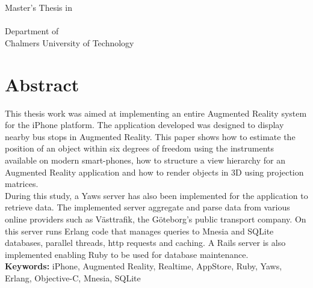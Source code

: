 \noindent
\thesistitle\\
\thesissubtitle\\
Master's Thesis in \textsf{\thesisprogram}\\
\thesisauthor\\
Department of \thesisdepartment\\
Chalmers University of Technology\\

\vspace{1.5cm}
\section*{Abstract}

This thesis work was aimed at implementing an entire Augmented Reality system for the iPhone platform. The application developed was designed to display nearby bus stops in Augmented Reality. This paper shows how to estimate the position of an object within six degrees of freedom using the instruments available on modern smart-phones, how to structure a view hierarchy for an Augmented Reality application and how to render objects in 3D using projection matrices.\\

During this study, a Yaws server has also been implemented for the application to retrieve data. The implemented server aggregate and parse data from various online providers such as Västtrafik, the Göteborg's public transport company. On this server runs Erlang code that manages queries to Mnesia and SQLite databases, parallel threads, http requests and caching. A Rails server is also implemented enabling Ruby to be used for database maintenance.\\

\vspace{\baselineskip}
\textbf{Keywords:} iPhone, Augmented Reality, Realtime, AppStore, Ruby, Yaws, Erlang, Objective-C, Mnesia, SQLite


